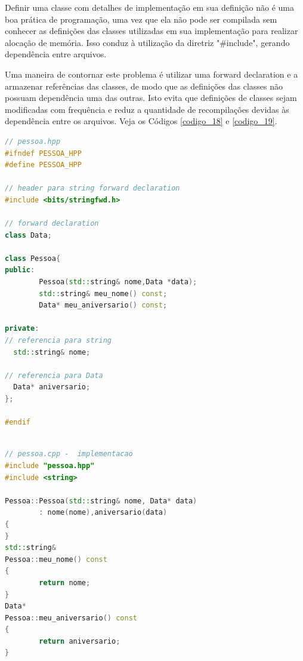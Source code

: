 Definir uma classe com detalhes de implementação em sua definição não é uma
 boa prática de programação, uma vez que ela não pode ser compilada sem
 conhecer as definições das classes utilizadas em sua implementação para
 realizar alocação de memória. Isso conduz à utilização da diretriz
 "\#include", gerando dependência entre arquivos\cite{ref44}.

Uma maneira de contornar este problema é utilizar uma forward declaration e a
 armazenar referências das classes, de modo que as definições das classes não
 possuam dependência uma das outras. Isto evita que definições de classes sejam
 modificadas com frequência e reduz a quantidade de recompilações devidas às
 dependência entre os  arquivos. Veja os Códigos \ref{codigo_18} 
e \ref{codigo_19}.


\begin{lstlisting}[language=C++,frame=single,captionpos=b,caption={ 
                         	     Arquivo definição da classe Pessoa,       
                          utilizando \textit{forward declaration}},
                                                label=codigo_18]
// pessoa.hpp 
#ifndef PESSOA_HPP
#define PESSOA_HPP

// header para string forward declaration
#include <bits/stringfwd.h>    

// forward declaration
class Data;            

class Pessoa{
public:
        Pessoa(std::string& nome,Data *data);
        std::string& meu_nome() const;
        Data* meu_aniversario() const;

private:
// referencia para string
  std::string& nome;

// referencia para Data
  Data* aniversario;
};

#endif

\end{lstlisting}


\begin{lstlisting}[language=C++,frame=single,captionpos=b,caption={ 
                          Arquivo definição da classe Pessoa,       
                      utilizando \textit{forward declaration} },
                                                label=codigo_19]

// pessoa.cpp -  implementacao
#include "pessoa.hpp"
#include <string>

Pessoa::Pessoa(std::string& nome, Data* data)
        : nome(nome),aniversario(data)
{
}
std::string&
Pessoa::meu_nome() const
{
        return nome;
}
Data*
Pessoa::meu_aniversario() const
{
        return aniversario;
}

\end{lstlisting}



